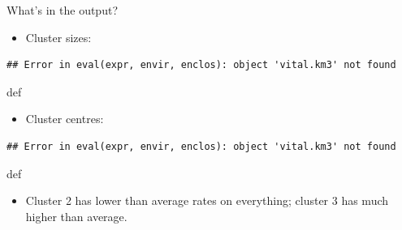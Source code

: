 \documentclass[ignorenonframetext,]{beamer}
\newenvironment{Shaded}{\begin{snugshade}}{\end{snugshade}}
\newcommand{\NormalTok}[1]{#1}
\newcommand{\OperatorTok}[1]{\textcolor[rgb]{0.81,0.36,0.00}{\textbf{#1}}}
\providecommand{\tightlist}{%
  \setlength{\itemsep}{0pt}\setlength{\parskip}{0pt}}
\begin{document}
\begin{frame}[fragile]{What's in the output?}
\protect\hypertarget{whats-in-the-output}{}

\begin{itemize}
\tightlist
\item
  Cluster sizes:
\end{itemize}

\begin{Shaded}
\end{Shaded}

\begin{verbatim}
## Error in eval(expr, envir, enclos): object 'vital.km3' not found
\end{verbatim}

def

\begin{itemize}
\tightlist
\item
  Cluster centres:
\end{itemize}

\begin{Shaded}
\end{Shaded}

\begin{verbatim}
## Error in eval(expr, envir, enclos): object 'vital.km3' not found
\end{verbatim}

def

\begin{itemize}
\tightlist
\item
  Cluster 2 has lower than average rates on everything; cluster 3 has
  much higher than average.
\end{itemize}

\end{frame}
\end{document}
